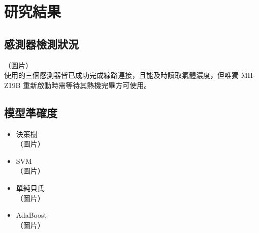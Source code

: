 \chapter{研究結果}

\section{感測器檢測狀況}
（圖片）\\
使用的三個感測器皆已成功完成線路連接，且能及時讀取氣體濃度，但唯獨 MH-Z19B 重新啟動時需等待其熱機完畢方可使用。

\section{模型準確度}
\begin{itemize}
	\item 決策樹\\
	（圖片）\\
	\item SVM\\
	（圖片）\\
	\item 單純貝氏\\
	（圖片）\\
	\item AdaBoost\\
	（圖片）\\
\end{itemize}

